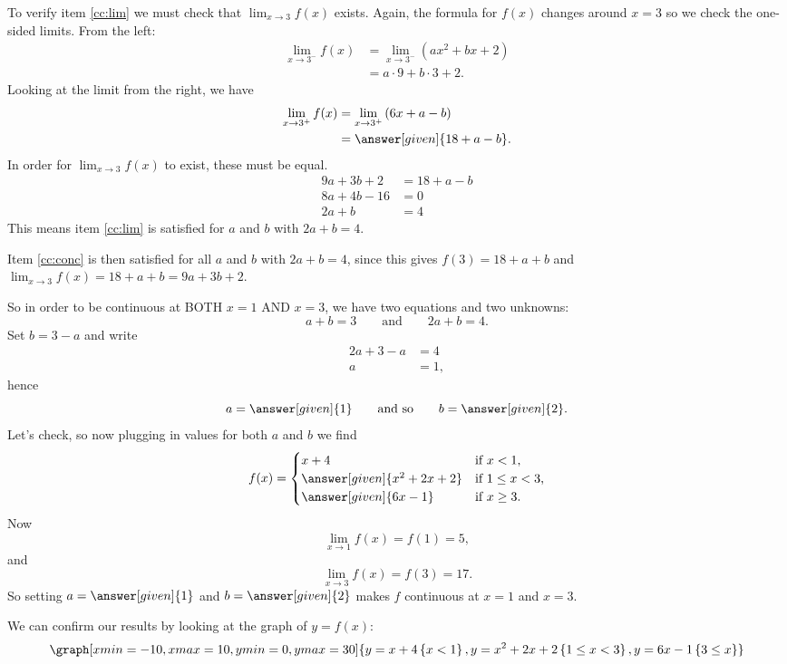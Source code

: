 \documentclass{ximera}
\begin{document}
\begin{example}
\begin{explanation}
		To verify item \ref{cc:lim} we must check that $\lim_{x\to 3}f(x)$ exists. Again, the formula for $f(x)$ changes around $x=3$ so we
		check the one-sided limits. From the left:
		\begin{align*}
			  \lim_{x\to 3^-} f(x) &= \lim_{x\to 3^-} \left(ax^2+bx+2\right) \\
				  &=a\cdot 9 + b\cdot 3 + 2.
		\end{align*}
		Looking at the limit from the right, we have
		\begin{align*}
			  \lim_{x\to 3^+} f(x) &= \lim_{x\to 3^+} \left(6x+a-b\right) \\
				  &= \answer[given]{18+a-b}.
		\end{align*}
		In order for $\lim_{x\to 3}f(x)$ to exist, these must be equal. 
		\begin{align*}
		  9a + 3b + 2 &= 18+a-b\\
		  8a + 4b -16 &= 0\\
		  2a + b  &= 4
		\end{align*}
		This means item \ref{cc:lim} is satisfied for $a$ and $b$ with $2a+b=4$. 
		
		Item \ref{cc:conc} is then satisfied for all $a$ and $b$ with $2a+b=4$, since this gives $f(3) = 18+a+b$ and $\lim_{x\to 3}f(x)=18+a+b = 9a+3b+2$.
		
		
		
		So in order to be continuous at BOTH $x=1$ AND $x=3$, we have two equations and two unknowns:
		\[
		 a+b=3 \qquad\text{and}\qquad 2a + b  = 4.
		 \]
		 Set $b = 3-a$ and write
		 \begin{align*}
		   2a+3-a&=4 \\
		  a &= 1,
		 \end{align*}
		 hence
		 \[
		 a=\answer[given]{1}\qquad\text{and so}\qquad b =\answer[given]{2}.
		 \]
		 Let's check, so now plugging in values for both $a$ and $b$ we find
		 \[
		 f(x) = 
		 \begin{cases}
		   x+4 &\text{if $x<1$,}\\
		   \answer[given]{x^2+2x+2} &\text{if $1\le x< 3$,}\\
		   \answer[given]{6x-1} &\text{if $x\ge 3$.}
		\end{cases}
		 \]
		 Now
		 \[
		 \lim_{x\to 1} f(x) = f(1) =  5,
		 \]
		 and
		 \[
		 \lim_{x\to 3} f(x)  = f(3) = 17.  
		 \]
		 So setting $a= \answer[given]{1}$ and $b=\answer[given]{2}$ makes $f$ continuous at $x=1$ and $x=3$.
		 \begin{onlineOnly}
		   We can confirm our results by looking at the graph of $y=f(x)$:
		   \[
		   \graph[xmin=-10,xmax=10,ymin=0,ymax=30]{y=x+4\left\{x<1\right\},y=x^2+2x+2\left\{1\leq x<3\right\},y=6x-1\left\{3 \leq x\right\}} 
		   \]
		 \end{onlineOnly}
	\end{explanation}
\end{example}
\end{document}
